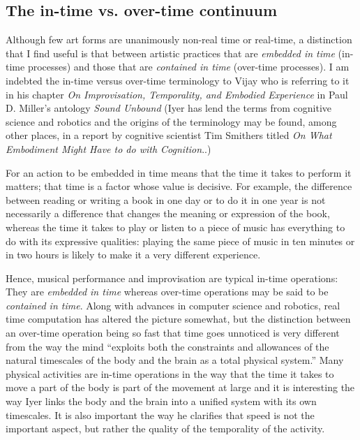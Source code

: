 \documentclass{article}
\begin{document}

\subsection{The in-time vs. over-time continuum}
\label{subsec:time-vs.-over}

Although few art forms are unanimously non-real time or real-time, a distinction that I find useful is that between artistic practices that are \emph{embedded in time} (in-time processes) and those that are \emph{contained in time} (over-time processes). I am indebted the in-time versus over-time terminology to Vijay \citet{iyer08} who is referring to it in his chapter \emph{On Improvisation, Temporality, and Embodied Experience} in Paul D. Miller's antology \emph{Sound Unbound} (Iyer has lend the terms from cognitive science and robotics and the origins of the terminology may be found, among other places, in a report by cognitive scientist Tim Smithers titled \emph{On What Embodiment Might Have to do with Cognition}.\citet{smithers96,smithers:98,vangelder98}.)

For an action to be embedded in time means that the time it takes to perform it matters; that time is a factor whose value is decisive. For example, the difference between reading or writing a book in one day or to do it in one year is not necessarily a difference that changes the meaning or expression of the book, whereas the time it takes to play or listen to a piece of music has everything to do with its expressive qualities: playing the same piece of music in ten minutes or in two hours is likely to make it a very different experience. %

Hence, musical performance and improvisation are typical in-time operations: They are \emph{embedded in time} whereas over-time operations may be said to be \emph{contained in time}. Along with advances in computer science and robotics, real time computation has altered the picture somewhat, but the distinction between an over-time operation being so fast that time goes unnoticed is very different from the way the mind ``exploits both the constraints and allowances of the natural timescales of the body and the brain as a total physical system.'' \citep[276]{iyer08} Many physical activities are in-time operations in the way that the time it takes to move a part of the body is part of the movement at large and it is interesting the way Iyer links the body and the brain into a unified system with its own timescales. It is also important the way he clarifies that speed is not the important aspect, but rather the quality of the temporality of the activity. 
\end{document}
